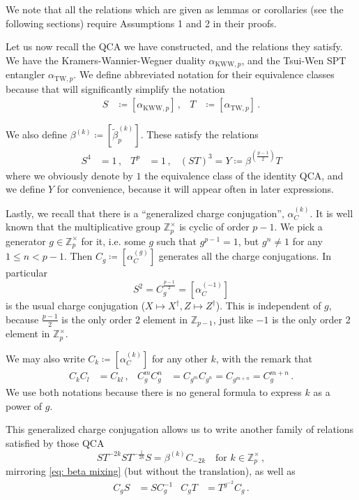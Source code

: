 \documentclass[aps,twocolumn,prx,floatfix,preprintnumbers, nofootinbib,10pt]{revtex4-2}
\numberwithin{equation}{section}
\theoremstyle{definition}
\theoremstyle{remark}
\theoremstyle{claim}
\newcommand{\be}{\begin{equation}}
\newcommand{\ee}{\end{equation}}
\newcommand{\aKWWp}{\alpha_{\text{KWW},p}}
\newcommand{\aTWp}{\alpha_{\text{TW},p}}
\newcommand{\Z}{{\mathbb Z}}
\begin{document}
{We note that all the relations which are given as lemmas or corollaries (see the following sections) require Assumptions 1 and 2 in their proofs.} 

Let us now recall the QCA we have constructed, and the relations they satisfy. We have the Kramers-Wannier-Wegner duality $\aKWWp$, and the Tsui-Wen SPT entangler $\aTWp$. We define abbreviated notation for their equivalence classes because that will significantly simplify the notation
\begin{align}
 S &\coloneqq [\aKWWp] \,, & T &\coloneqq [\aTWp] \,.
\end{align}

We also define $\beta^{(k)} \coloneqq [\tilde{\beta}_p^{(k)}]$. These satisfy the relations
\begin{align}\label{eq:sty_relations}
 S^4 &= 1 \,, & T^p &= 1 \,, & (ST)^3 = Y \coloneqq \beta^{(\frac{p-1}{2})} T
\end{align}
where we obviously denote by $1$ the equivalence class of the identity QCA, and we define $Y$ for convenience, because it will appear often in later expressions.

Lastly, we recall that there is a ``generalized charge conjugation'', $\alpha_C^{(k)}$. It is well known that the multiplicative group $\Z_p^\times$ is cyclic of order $p - 1$. We pick a generator $g \in \Z_p^\times$ for it, i.e. some $g$ such that $g^{p-1} = 1$, but $g^n \neq 1$ for any $1 \leq n < p - 1$. Then $C_g \coloneqq [\alpha_C^{(g)}]$ generates all the charge conjugations. In particular
\be\label{eq:s2c_relations}
S^2 = C_g^{\frac{p-1}{2}} = [\alpha_C^{(-1)}]
\ee
is the usual charge conjugation ($X \mapsto X^\dag, Z \mapsto Z^\dag$). This is independent of $g$, because $\frac{p - 1}{2}$ is the only order 2 element in $\Z_{p-1}$, just like $-1$ is the only order 2 element in $\Z_p^\times$.

We may also write $C_{k} \coloneqq [\alpha_C^{(k)}]$ for any other $k$, with the remark that
\begin{align}\label{eq:c_k_relations}
C_k C_l &= C_{k l} \,, & C_g^m C_g^n &= C_{g^m} C_{g^n} = C_{g^{m+n}} = C_g^{m + n} \,.
\end{align}
We use both notations because there is no general formula to express $k$ as a power of $g$.

This generalized charge conjugation allows us to write another family of relations satisfied by those QCA
\be\label{eq:additional_identities}
S T^{-2k} S T^{-\frac{1}{2k}} S = \beta^{(k)} C_{-2k} \quad \text{for } k \in \Z_p^\times \,,
\ee
mirroring \eqref{eq: beta mixing} (but without the translation), as well as
\begin{align}\label{eq:CS_CT}
 C_g S &= S C_g^{-1} & C_g T &= T^{g^{-2}} C_g \,.
\end{align}
\end{document}
